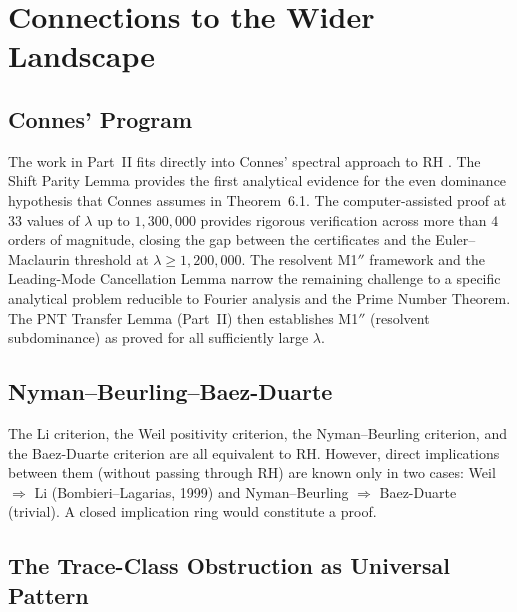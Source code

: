 \documentclass[12pt,a4paper]{article}
\theoremstyle{definition}
\theoremstyle{remark}
\begin{document}
\section{Connections to the Wider Landscape}
\label{sec:connections}

\subsection{Connes' Program}

The work in Part~II fits directly into Connes' spectral approach to RH \cite{Connes2026}. The Shift Parity Lemma provides the first analytical evidence for the even dominance hypothesis that Connes assumes in Theorem~6.1. The computer-assisted proof at $33$ values of $\lambda$ up to $1{,}300{,}000$ provides rigorous verification across more than $4$ orders of magnitude, closing the gap between the certificates and the Euler--Maclaurin threshold at $\lambda \geq 1{,}200{,}000$. The resolvent M1$''$ framework and the Leading-Mode Cancellation Lemma narrow the remaining challenge to a specific analytical problem reducible to Fourier analysis and the Prime Number Theorem. The PNT Transfer Lemma (Part~II) then establishes M1$''$ (resolvent subdominance) as proved for all sufficiently large $\lambda$.

\subsection{Nyman--Beurling--Baez-Duarte}

The Li criterion, the Weil positivity criterion, the Nyman--Beurling criterion, and the Baez-Duarte criterion are all equivalent to RH. However, direct implications between them (without passing through RH) are known only in two cases: Weil $\Rightarrow$ Li (Bombieri--Lagarias, 1999) and Nyman--Beurling $\Rightarrow$ Baez-Duarte (trivial). A closed implication ring would constitute a proof.

\subsection{The Trace-Class Obstruction as Universal Pattern}
\end{document}
